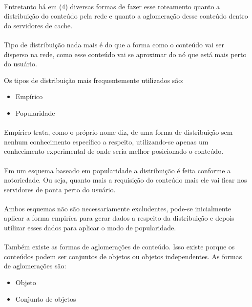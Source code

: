 \paragraph{} Entretanto h\'a em (4) diversas formas de fazer esse roteamento quanto a distribui\c{c}\~ao do conte\'udo pela rede e quanto a aglomera\c{c}\~ao desse conte\'udo dentro do servidores de cache. 
\paragraph{} Tipo de distribui\c{c}\~ao nada mais \'e do que a forma como o conte\'udo vai ser disperso na rede, como esse conte\'udo vai se aproximar do n\'o que est\'a mais perto do usu\'ario. 

Os tipos de distribui\c{c}\~ao mais frequentemente utilizados s\~ao:
\begin{itemize}
	\item Emp\'irico
	\item Popularidade
\end{itemize}

\paragraph{} Emp\'irico trata, como o pr\'oprio nome diz, de uma forma de distribui\c{c}\~ao sem nenhum conhecimento espec\'ifico a respeito, utilizando-se apenas um conhecimento experimental de onde seria melhor posicionado o conte\'udo.
\paragraph{} Em um esquema baseado em popularidade a distribui\c{c}\~ao \'e feita conforme a notoriedade. Ou seja, quanto mais a requisi\c{c}\~ao do conte\'udo mais ele vai ficar nos servidores de ponta perto do usu\'ario.
\paragraph{} Ambos esquemas n\~ao s\~ao necessariamente excludentes, pode-se inicialmente aplicar a forma empir\'ica para gerar dados a respeito da distribui\c{c}\~ao e depois utilizar esses dados para aplicar o modo de popularidade.
	
\paragraph{} Tamb\'em existe as formas de aglomera\c{c}\~oes de conte\'udo. Isso existe porque os conte\'udos podem ser conjuntos de objetos ou objetos independentes. 
As formas de aglomera\c{c}\~oes s\~ao:
\begin{itemize}
	\item Objeto
	\item Conjunto de objetos
\end{itemize}

